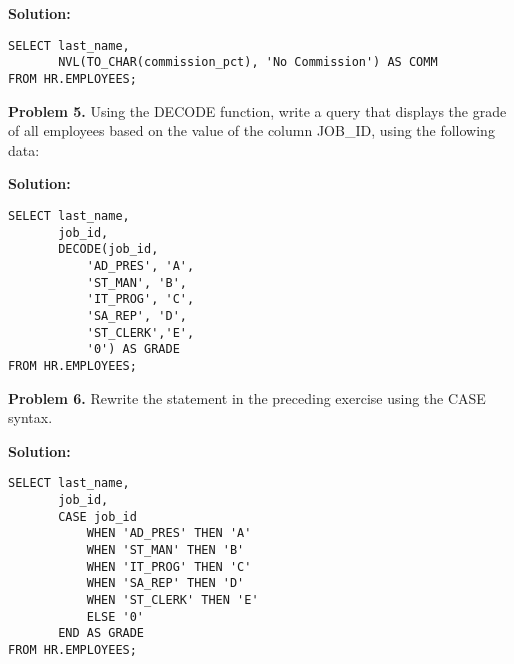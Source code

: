 \documentclass[12pt,a4paper]{article}
\begin{document}
\textbf{Solution:}
\begin{lstlisting}[style=sqlstyle]
SELECT last_name,
       NVL(TO_CHAR(commission_pct), 'No Commission') AS COMM
FROM HR.EMPLOYEES;
\end{lstlisting}

\textbf{Problem 5.} Using the DECODE function, write a query that displays the grade of all employees based on the value of the column JOB\_ID, using the following data:

\textbf{Solution:}
\begin{lstlisting}[style=sqlstyle]
SELECT last_name,
       job_id,
       DECODE(job_id,
           'AD_PRES', 'A',
           'ST_MAN', 'B',
           'IT_PROG', 'C',
           'SA_REP', 'D',
           'ST_CLERK','E',
           '0') AS GRADE
FROM HR.EMPLOYEES;
\end{lstlisting}

\textbf{Problem 6.} Rewrite the statement in the preceding exercise using the CASE syntax.

\textbf{Solution:}
\begin{lstlisting}[style=sqlstyle]
SELECT last_name,
       job_id,
       CASE job_id
           WHEN 'AD_PRES' THEN 'A'
           WHEN 'ST_MAN' THEN 'B'
           WHEN 'IT_PROG' THEN 'C'
           WHEN 'SA_REP' THEN 'D'
           WHEN 'ST_CLERK' THEN 'E'
           ELSE '0'
       END AS GRADE
FROM HR.EMPLOYEES;
\end{lstlisting}
\end{document}
